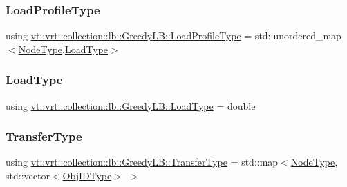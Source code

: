 \subsubsection{\texorpdfstring{Load\+Profile\+Type}{LoadProfileType}}
{\footnotesize\ttfamily using \hyperlink{structvt_1_1vrt_1_1collection_1_1lb_1_1_greedy_l_b_a3db2c9b36ac99ed4aed38519be4aad60}{vt\+::vrt\+::collection\+::lb\+::\+Greedy\+L\+B\+::\+Load\+Profile\+Type} =  std\+::unordered\+\_\+map$<$\hyperlink{namespacevt_a866da9d0efc19c0a1ce79e9e492f47e2}{Node\+Type},\hyperlink{structvt_1_1vrt_1_1collection_1_1lb_1_1_base_l_b_a215e22b9f12678303f49615ae3be05cc}{Load\+Type}$>$}

\mbox{\label{structvt_1_1vrt_1_1collection_1_1lb_1_1_greedy_l_b_a7127421bb4c8c56482d07cb6e35ccc11}} 
\subsubsection{\texorpdfstring{Load\+Type}{LoadType}}
{\footnotesize\ttfamily using \hyperlink{structvt_1_1vrt_1_1collection_1_1lb_1_1_greedy_l_b_a7127421bb4c8c56482d07cb6e35ccc11}{vt\+::vrt\+::collection\+::lb\+::\+Greedy\+L\+B\+::\+Load\+Type} =  double}

\mbox{\label{structvt_1_1vrt_1_1collection_1_1lb_1_1_greedy_l_b_af15e80ab3cfa9337647801dfa08fbf53}} 
\subsubsection{\texorpdfstring{Transfer\+Type}{TransferType}}
{\footnotesize\ttfamily using \hyperlink{structvt_1_1vrt_1_1collection_1_1lb_1_1_greedy_l_b_af15e80ab3cfa9337647801dfa08fbf53}{vt\+::vrt\+::collection\+::lb\+::\+Greedy\+L\+B\+::\+Transfer\+Type} =  std\+::map$<$\hyperlink{namespacevt_a866da9d0efc19c0a1ce79e9e492f47e2}{Node\+Type}, std\+::vector$<$\hyperlink{structvt_1_1vrt_1_1collection_1_1lb_1_1_base_l_b_a15a2f756b59c8c2437985206b32aa403}{Obj\+I\+D\+Type}$>$ $>$}




